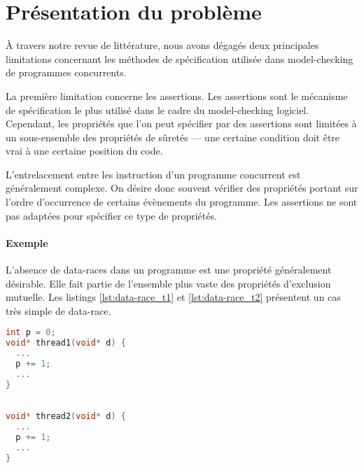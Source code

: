 \label{sec:Theme1}

\section{Présentation du problème}

À travers notre revue de littérature, nous avons dégagés deux principales
limitations concernant les méthodes de spécification utilisée dans
model-checking de programmes concurrents.

La première limitation concerne les assertions.
Les assertions sont le mécanisme de spécification le plus utilisé dans le cadre
du model-checking logiciel. Cependant, les propriétés que l'on peut spécifier
par des assertions sont limitées à un sous-ensemble des propriétés de sûretés
--- une certaine condition doit être vrai à une certaine position du code.

L'entrelacement entre les instruction d'un programme concurrent est généralement
complexe. On désire donc souvent vérifier des propriétés portant sur l'ordre
d'occurrence de certains évènements du programme.
Les assertions ne sont pas adaptées pour spécifier ce type de propriétés.

\paragraph{Exemple}
L'absence de data-races dans un programme est une propriété généralement
désirable. Elle fait partie de l'ensemble plus vaste des propriétés d'exclusion
mutuelle. Les listings \ref{lst:data-race_t1} et \ref{lst:data-race_t2}
présentent un cas très simple de data-race.

\noindent\begin{minipage}{.45\textwidth}
  \begin{lstlisting}[language=C, frame=single, caption=Thread 1,
    label=lst:data-race_t1]
int p = 0;
void* thread1(void* d) {
  ...
  p += 1;
  ...
}
\end{lstlisting}
\end{minipage}\hfill
\begin{minipage}{.45\textwidth}
\begin{lstlisting}[language=C, frame=single, caption=Thread 2,
    label=lst:data-race_t2]

void* thread2(void* d) {
  ...
  p += 1;
  ...
}
\end{lstlisting}
\end{minipage}


